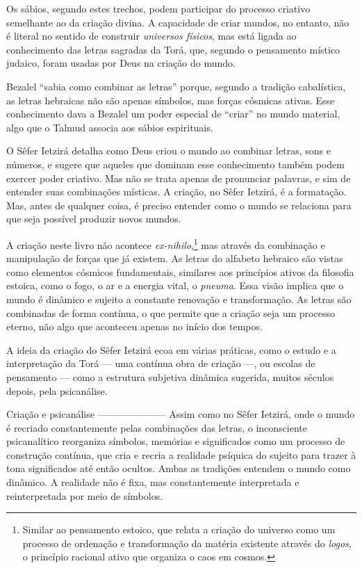 Os sábios, segundo estes trechos, podem participar do processo criativo semelhante ao da criação divina. A capacidade de criar mundos, no entanto, não é literal no sentido de construir \textit{universos físicos}, mas está ligada ao conhecimento das letras sagradas da Torá, que, segundo o pensamento místico judaico, foram usadas por Deus na criação do mundo.

Bezalel ``sabia como combinar as letras'' porque, segundo a tradição cabalística, as letras hebraicas não são apenas símbolos, mas forças cósmicas ativas. Esse conhecimento dava a Bezalel um poder especial de ``criar'' no mundo material, algo que o Talmud associa aos sábios espirituais.

O Sêfer Ietzirá detalha como Deus criou o mundo ao combinar letras, sons e números, e sugere que aqueles que dominam esse conhecimento também podem exercer poder criativo. Mas não se trata apenas de pronunciar palavras, e sim de entender suas combinações místicas. A criação, no Sêfer Ietzirá, é a formatação. Mas, antes de qualquer coisa, é preciso entender como o mundo se relaciona para que seja possível produzir novos mundos. 

A criação neste livro não acontece \textit{ex-nihilo},\footnote{Similar ao pensamento estoico, que relata a criação do universo como um processo de ordenação e transformação da matéria existente através do \textit{logos}, o princípio racional ativo que organiza o caos em cosmos.} mas através da combinação e manipulação de forças que já existem. As letras do alfabeto hebraico são vistas como elementos cósmicos fundamentais, similares aos princípios ativos da filosofia estoica, como o fogo, o ar e a energia vital, o \textit{pneuma}. Essa visão implica que o mundo é dinâmico e sujeito a constante renovação e transformação. As letras são combinadas de forma contínua, o que permite que a criação seja um processo eterno, não algo que aconteceu apenas no início dos tempos.

A ideia da criação do Sêfer Ietzirá ecoa em várias práticas, como o estudo e a interpretação da Torá --- uma contínua obra de criação ---, ou escolas de pensamento --- como a estrutura subjetiva dinâmica sugerida, muitos séculos depois, pela psicanálise. 

Criação e psicanálise
---------------------
Assim como no Sêfer Ietzirá, onde o mundo é recriado constantemente pelas combinações das letras, o inconsciente psicanalítico reorganiza símbolos, memórias e significados como um processo de construção contínua, que cria e recria a realidade psíquica do sujeito para trazer à tona significados até então ocultos. Ambas as tradições entendem o mundo como dinâmico. A realidade não é fixa, mas constantemente interpretada e reinterpretada por meio de símbolos. 

